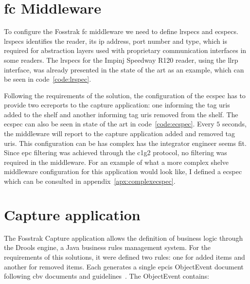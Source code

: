 \section{\acs{fc} Middleware}

To configure the Fosstrak \ac{fc} middleware we need to define \acp{lrspec} and \acp{ecspec}.
\acp{lrspec} identifies the reader, its \ac{ip} address, port number and type, which is required for abstraction layers used with proprietary communication interfaces in some readers.
The \acp{lrspec} for the Impinj Speedway R120 reader, using the \ac{llrp} interface, was already presented in the state of the art as an example, which can be seen in code~\ref{code:lrspec}.

Following the requirements of the solution, the configuration of the \ac{ecspec} has to provide two \acp{ecreport} to the capture application: one informing the tag \acp{uri} added to the shelf and another informing tag \acp{uri} removed from the shelf.
The \ac{ecspec} can also be seen in state of the art in code~\ref{code:ecspec}.
Every $5$ seconds, the middleware will report to the capture application added and removed tag \acp{uri}.
This configuration can be has complex has the integrator engineer seems fit. Since \ac{epc} filtering was achieved through the \ac{c1g2} protocol, no filtering was required in the middleware. For an example of what a more complex shelve middleware configuration for this application would look like, I defined a \ac{ecspec} which can be consulted in appendix~\ref{apx:complexecspec}.

\section{Capture application}

The Fosstrak Capture application allows the definition of business logic through the Drools engine, a Java business rules management system.
For the requirements of this solutions, it were defined two rules: one for added items and another for removed items. Each generates a single \ac{epcis} ObjectEvent document following \ac{cbv} documents and guidelines~\cite{CoreBusinessVocabulary}. The ObjectEvent contains:

